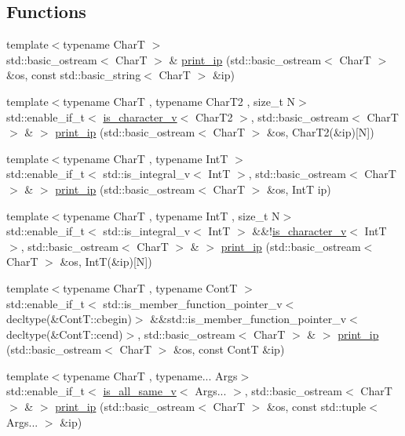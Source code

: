 \subsection*{Functions}
\begin{DoxyCompactItemize}
\item 
{\footnotesize template$<$typename CharT $>$ }\\std\+::basic\+\_\+ostream$<$ CharT $>$ \& \hyperlink{namespacegriha_a96b354d613153a0e77c127911a2e1ae0}{print\+\_\+ip} (std\+::basic\+\_\+ostream$<$ CharT $>$ \&os, const std\+::basic\+\_\+string$<$ CharT $>$ \&ip)
\item 
{\footnotesize template$<$typename CharT , typename Char\+T2 , size\+\_\+t N$>$ }\\std\+::enable\+\_\+if\+\_\+t$<$ \hyperlink{namespacegriha_af6e5a84a5dad7d2123491eb7124aa2e3}{is\+\_\+character\+\_\+v}$<$ Char\+T2 $>$, std\+::basic\+\_\+ostream$<$ CharT $>$ \& $>$ \hyperlink{namespacegriha_adb22fea7479742dc1c0a3d7c7995fc0b}{print\+\_\+ip} (std\+::basic\+\_\+ostream$<$ CharT $>$ \&os, Char\+T2(\&ip)\mbox{[}N\mbox{]})
\item 
{\footnotesize template$<$typename CharT , typename IntT $>$ }\\std\+::enable\+\_\+if\+\_\+t$<$ std\+::is\+\_\+integral\+\_\+v$<$ IntT $>$, std\+::basic\+\_\+ostream$<$ CharT $>$ \& $>$ \hyperlink{namespacegriha_a4b0d906169c2b4c51fe323184bbc8f44}{print\+\_\+ip} (std\+::basic\+\_\+ostream$<$ CharT $>$ \&os, IntT ip)
\item 
{\footnotesize template$<$typename CharT , typename IntT , size\+\_\+t N$>$ }\\std\+::enable\+\_\+if\+\_\+t$<$ std\+::is\+\_\+integral\+\_\+v$<$ IntT $>$ \&\&!\hyperlink{namespacegriha_af6e5a84a5dad7d2123491eb7124aa2e3}{is\+\_\+character\+\_\+v}$<$ IntT $>$, std\+::basic\+\_\+ostream$<$ CharT $>$ \& $>$ \hyperlink{namespacegriha_aaa000663a06d833560a824a34a5ae42c}{print\+\_\+ip} (std\+::basic\+\_\+ostream$<$ CharT $>$ \&os, IntT(\&ip)\mbox{[}N\mbox{]})
\item 
{\footnotesize template$<$typename CharT , typename ContT $>$ }\\std\+::enable\+\_\+if\+\_\+t$<$ std\+::is\+\_\+member\+\_\+function\+\_\+pointer\+\_\+v$<$ decltype(\&Cont\+T\+::cbegin)$>$ \&\&std\+::is\+\_\+member\+\_\+function\+\_\+pointer\+\_\+v$<$ decltype(\&Cont\+T\+::cend)$>$, std\+::basic\+\_\+ostream$<$ CharT $>$ \& $>$ \hyperlink{namespacegriha_a11ead801358ba902938ff6dcb9ac4da2}{print\+\_\+ip} (std\+::basic\+\_\+ostream$<$ CharT $>$ \&os, const ContT \&ip)
\item 
{\footnotesize template$<$typename CharT , typename... Args$>$ }\\std\+::enable\+\_\+if\+\_\+t$<$ \hyperlink{namespacegriha_a3c9eb374b11b670884dfabc46b7bbc23}{is\+\_\+all\+\_\+same\+\_\+v}$<$ Args... $>$, std\+::basic\+\_\+ostream$<$ CharT $>$ \& $>$ \hyperlink{namespacegriha_acd1e1da8a6524b3c7521bc759da1c3ae}{print\+\_\+ip} (std\+::basic\+\_\+ostream$<$ CharT $>$ \&os, const std\+::tuple$<$ Args... $>$ \&ip)
\end{DoxyCompactItemize}
